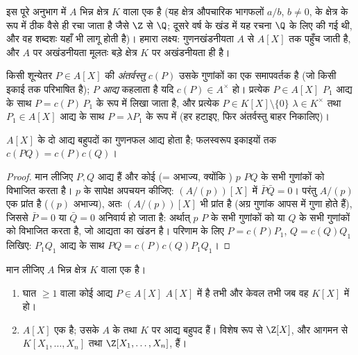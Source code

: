 इस पूरे अनुभाग में $A$ भिन्न क्षेत्र $K$ वाला एक  है
(यह क्षेत्र औपचारिक भागफलों $a/b$, $b \neq 0$, के क्षेत्र के रूप
में ठीक वैसे ही रचा जाता है जैसे $\Z$ से $\Q$; दूसरे वर्ष के
खंड में यह रचना $\Q$ के लिए की गई थी, और वह शब्दशः यहाँ भी
लागू होती है)। हमारा लक्ष्य: गुणनखंडनीयता $A$ से $A[X]$ तक
पहुँच जाती है, और $A$ पर अखंडनीयता मूलतः बड़े क्षेत्र $K$ पर
अखंडनीयता ही है।

\begin{definition}\label{def:b3:rings:content}
किसी शून्येतर $P \in A[X]$ की \emph{अंतर्वस्तु} $c(P)$ उसके गुणांकों का एक  समापवर्तक है (जो
किसी इकाई तक परिभाषित है); $P$ \emph{आद्य} कहलाता है यदि
$c(P) \in A^\times$ हो। प्रत्येक $P
\in A[X]$ $P_1$ आद्य के साथ $P = c(P)\,P_1$ के रूप में
लिखा जाता है, और प्रत्येक $P \in K[X]\setminus\{0\}$ $\lambda
\in K^\times$ तथा $P_1 \in A[X]$ आद्य के साथ
$P = \lambda P_1$ के रूप में (हर हटाइए, फिर अंतर्वस्तु बाहर निकालिए)।
\end{definition}

\begin{lemma}[गाउस]\label{lem:b3:rings:gauss}
$A[X]$ के दो आद्य बहुपदों का गुणनफल आद्य होता है; फलस्वरूप इकाइयों
तक $c(PQ) = c(P)c(Q)$।
\end{lemma}

\begin{proof}
मान लीजिए $P, Q$ आद्य हैं और कोई  (= अभाज्य, क्योंकि )
$p$ $PQ$ के सभी गुणांकों को विभाजित करता है। $p$ के सापेक्ष
अपचयन कीजिए: $(A/(p))[X]$ में $\bar P \bar Q = 0$। परंतु $A/(p)$ एक प्रांत है ($(p)$
अभाज्य), अतः $(A/(p))[X]$ भी प्रांत है (अग्र गुणांक आपस में गुणा होते
हैं), जिससे $\bar P = 0$ या $\bar Q = 0$ अनिवार्य हो जाता है: अर्थात् $p$
$P$ के सभी गुणांकों को या $Q$ के सभी गुणांकों को विभाजित
करता है, जो आद्यता का खंडन है। परिणाम के लिए $P = c(P)P_1$, $Q = c(Q)Q_1$ लिखिए:
$P_1Q_1$ आद्य के साथ $PQ =
c(P)c(Q) P_1Q_1$।
\end{proof}

\begin{theorem}\label{thm:b3:rings:gaussufd}
मान लीजिए $A$ भिन्न क्षेत्र $K$ वाला एक  है।
\begin{enumerate}
  \item घात $\geq 1$ वाला कोई आद्य $P \in A[X]$ $A[X]$ में  है तभी
        और केवल तभी जब वह $K[X]$ में  हो।
  \item $A[X]$ एक  है; उसके  $A$ के 
        तथा $K$ पर  आद्य बहुपद हैं। विशेष रूप से $\Z[X]$,
        और आगमन से $K[X_1, \dots, X_n]$ तथा $\Z[X_1, \dots, X_n]$,  हैं।
\end{enumerate}
\end{theorem}

